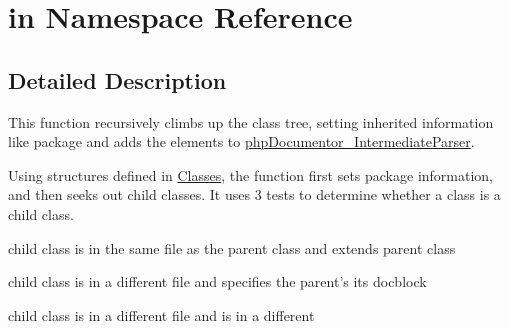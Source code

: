 \hypertarget{namespacein}{\section{in \-Namespace \-Reference}
\label{namespacein}
}


\subsection{\-Detailed \-Description}
\-This function recursively climbs up the class tree, setting inherited information like package and adds the elements to \hyperlink{classphp_documentor___intermediate_parser}{php\-Documentor\-\_\-\-Intermediate\-Parser}.

\-Using structures defined in \hyperlink{class_classes}{\-Classes}, the function first sets package information, and then seeks out child classes. \-It uses 3 tests to determine whether a class is a child class. 
\begin{DoxyEnumerate}
\item child class is in the same file as the parent class and extends parent class  
\item child class is in a different file and specifies the parent's its docblock  
\item child class is in a different file and is in a different 
\end{DoxyEnumerate}